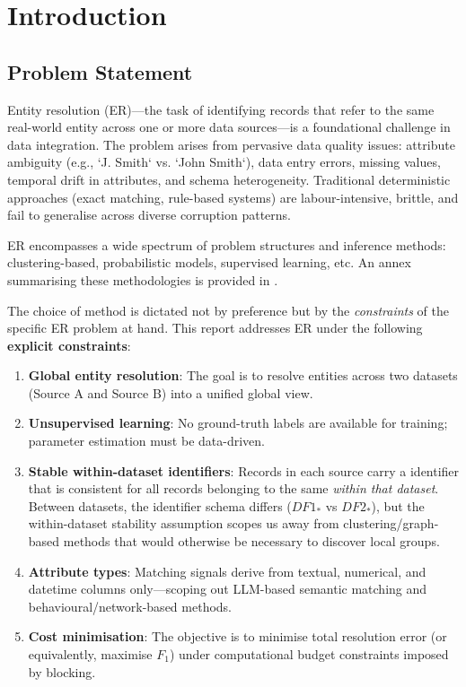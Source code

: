 \section{Introduction}
\label{sec:introduction}

\subsection{Problem Statement}
\label{sec:problem_statement}

Entity resolution (ER)—the task of identifying records that refer to the same real-world entity across one or more data sources—is a foundational challenge in data integration.
The problem arises from pervasive data quality issues: attribute ambiguity (e.g., `J. Smith` vs. `John Smith`), data entry errors, missing values, temporal drift in attributes, and schema heterogeneity.
Traditional deterministic approaches (exact matching, rule-based systems) are labour-intensive, brittle, and fail to generalise across diverse corruption patterns.

ER encompasses a wide spectrum of problem structures and inference methods: clustering-based, probabilistic models, supervised learning, etc. An annex summarising these methodologies is provided in .

The choice of method is dictated not by preference but by the \textit{constraints} of the specific ER problem at hand.
This report addresses ER under the following \textbf{explicit constraints}:

\begin{enumerate}
	\item \textbf{Global entity resolution}: The goal is to resolve entities across two datasets (Source A and Source B) into a unified global view.
	\item \textbf{Unsupervised learning}: No ground-truth labels are available for training; parameter estimation must be data-driven.
	\item \textbf{Stable within-dataset identifiers}: Records in each source carry a \localentity{} identifier that is consistent for all records belonging to the same \globalentity{} \textit{within that dataset}.
	      Between datasets, the identifier schema differs ($DF1_*$ vs $DF2_*$), but the within-dataset stability assumption scopes us away from clustering/graph-based methods that would otherwise be necessary to discover local groups.
	\item \textbf{Attribute types}: Matching signals derive from textual, numerical, and datetime columns only—scoping out LLM-based semantic matching and behavioural/network-based methods.
	\item \textbf{Cost minimisation}: The objective is to minimise total resolution error (or equivalently, maximise $F_1$) under computational budget constraints imposed by blocking.
\end{enumerate}

